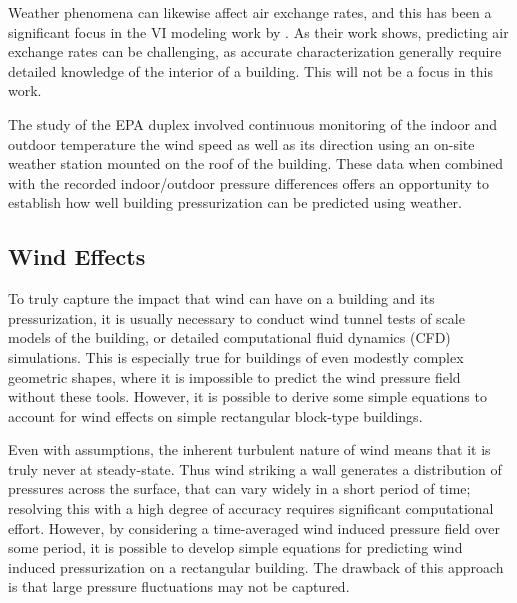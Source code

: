 Weather phenomena can likewise affect air exchange rates, and this has been a significant focus in the VI modeling work by \citeauthor{shirazi_three-dimensional_2017}\cite{shirazi_three-dimensional_2017}.
As their work shows, predicting air exchange rates can be challenging, as accurate characterization generally require detailed knowledge of the interior of a building.
This will not be a focus in this work.\par

The study of the EPA duplex involved continuous monitoring of the indoor and outdoor temperature the wind speed as well as its direction using an on-site weather station mounted on the roof of the building.
These data when combined with the recorded indoor/outdoor pressure differences offers an opportunity to establish how well building pressurization can be predicted using weather.\par

\subsection{Wind Effects}

To truly capture the impact that wind can have on a building and its pressurization, it is usually necessary to conduct wind tunnel tests of scale models of the building, or detailed computational fluid dynamics (CFD) simulations.
This is especially true for buildings of even modestly complex geometric shapes, where it is impossible to predict the wind pressure field without these tools.
However, it is possible to derive some simple equations to account for wind effects on simple rectangular block-type buildings.\par

Even with assumptions, the inherent turbulent nature of wind means that it is truly never at steady-state.
Thus wind striking a wall generates a distribution of pressures across the surface, that can vary widely in a short period of time; resolving this with a high degree of accuracy requires significant computational effort.
However, by considering a time-averaged wind induced pressure field over some period, it is possible to develop simple equations for predicting wind induced pressurization on a rectangular building.
The drawback of this approach is that large pressure fluctuations may not be captured.\par

